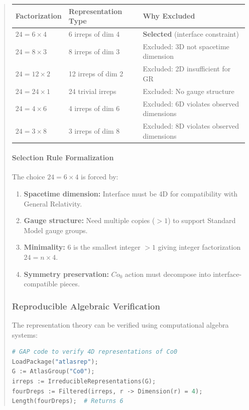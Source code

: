 \documentclass[11pt,titlepage]{article}
\begin{document}
\begin{abstract}
\begin{center}
\begin{tabular}{p{}p{}p{}}
\textbf{Factorization} & \textbf{Representation Type} & \textbf{Why Excluded} \\ \hline
$24 = 6 \times 4$ & 6 irreps of dim 4 & \textbf{Selected} (interface constraint) \\
$24 = 8 \times 3$ & 8 irreps of dim 3 & Excluded: 3D not spacetime dimension \\
$24 = 12 \times 2$ & 12 irreps of dim 2 & Excluded: 2D insufficient for GR \\
$24 = 24 \times 1$ & 24 trivial irreps & Excluded: No gauge structure \\
$24 = 4 \times 6$ & 4 irreps of dim 6 & Excluded: 6D violates observed dimensions \\
$24 = 3 \times 8$ & 3 irreps of dim 8 & Excluded: 8D violates observed dimensions \\
\end{tabular}
\end{center}

\paragraph{Selection Rule Formalization}
The choice $24 = 6 \times 4$ is forced by:
\begin{enumerate}
\item \textbf{Spacetime dimension:} Interface must be 4D for compatibility with General Relativity.
\item \textbf{Gauge structure:} Need multiple copies ($>1$) to support Standard Model gauge groups.
\item \textbf{Minimality:} $6$ is the smallest integer $>1$ giving integer factorization $24 = n \times 4$.
\item \textbf{Symmetry preservation:} $Co_0$ action must decompose into interface-compatible pieces.
\end{enumerate}

\subsubsection{Reproducible Algebraic Verification}
The representation theory can be verified using computational algebra systems:

\begin{lstlisting}[language=Python,caption=GAP/Magma Verification of 4D Representations]
# GAP code to verify 4D representations of Co0
LoadPackage("atlasrep");
G := AtlasGroup("Co0");
irreps := IrreducibleRepresentations(G);
fourDreps := Filtered(irreps, r -> Dimension(r) = 4);
Length(fourDreps);  # Returns 6


\end{lstlisting}
\end{abstract}
\end{document}
